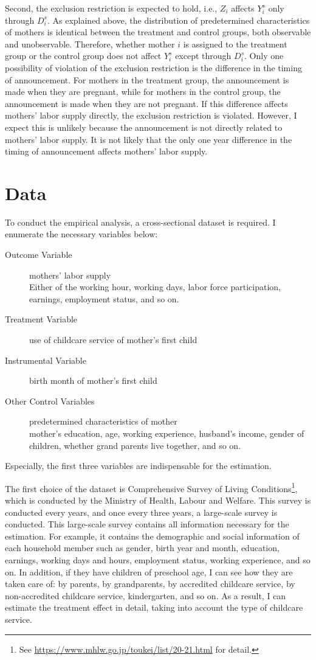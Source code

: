 \documentclass[12pt]{article}
\begin{document}
Second, the exclusion restriction is expected to hold, i.e., $Z_i$ affects $Y_i^s$ only through $D_i^s$.
As explained above, the distribution of predetermined characteristics of mothers is identical between the treatment and control groups, both observable and unobservable.
Therefore, whether mother $i$ is assigned to the treatment group or the control group does not affect $Y_i^s$ except through $D_i^s$.
Only one possibility of violation of the exclusion restriction is the difference in the timing of announcement. 
For mothers in the treatment group, the announcement is made when they are pregnant, while for mothers in the control group, the announcement is made when they are not pregnant.
If this difference affects mothers' labor supply directly, the exclusion restriction is violated.
However, I expect this is unlikely because the announcement is not directly related to mothers' labor supply.
It is not likely that the only one year difference in the timing of announcement affects mothers' labor supply.

\section{Data}
To conduct the empirical analysis, a cross-sectional dataset is required.
I enumerate the necessary variables below: 
\begin{description}
  \item[Outcome Variable] mothers' labor supply \\ 
  Either of the working hour, working days, labor force participation, earnings, employment status, and so on.
  \item[Treatment Variable] use of childcare service of mother's first child 
  \item[Instrumental Variable] birth month of mother's first child
  \item[Other Control Variables] predetermined characteristics of mother \\
  mother's education, age, working experience, husband's income, gender of children, whether grand parents live together, and so on.
\end{description}
Especially, the first three variables are indispensable for the estimation. 


The first choice of the dataset is Comprehensive Survey of Living Conditions\footnote{See \url{https://www.mhlw.go.jp/toukei/list/20-21.html} for detail.}, which is conducted by the Ministry of Health, Labour and Welfare.
This survey is conducted every years, and once every three years, a large-scale survey is conducted.
This large-scale survey contains all information necessary for the estimation.
For example, it contains the demographic and social information of each household member such as gender, birth year and month, education, earnings, working days and hours, employment status, working experience, and so on.
In addition, if they have children of preschool age, I can see how they are taken care of: by parents, by grandparents, by accredited childcare service, by non-accredited childcare service, kindergarten, and so on. 
As a result, I can estimate the treatment effect in detail, taking into account the type of childcare service.
\end{document}
